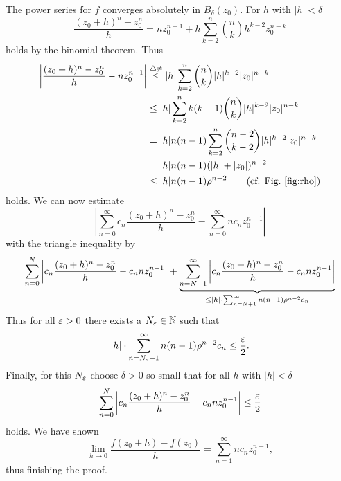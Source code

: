 \documentclass[a4paper,english]{article}
\begin{document}
\begin{pr}
    The power series for $f$ converges absolutely in $B_{\delta}(z_0)$.
    For $h$ with $| h | < \delta$
    \begin{equation*}
        \frac{(z_0 + h)^n - z_0^n}{h}
        = n z_0^{n - 1} + h \sum_{k = 2}^{n} \binom{n}{k} h^{k - 2} z_0^{n - k}
    \end{equation*}
    holds by the binomial theorem.
    Thus
    \begin{align*}
        \left|  \frac{(z_0 + h)^n - z_0^n}{h}
        - n z_0^{n - 1} \right|
        & \overset{\triangle \ne}{\le}
        | h | \sum_{k = 2}^{n} \binom{n}{k} |h|^{k - 2} |z_0|^{n - k} \\
        & \le | h | \sum_{k = 2}^{n} k (k - 1) \binom{n}{k} |h|^{k - 2} |z_0|^{n - k} \\
        & = | h | n (n - 1) \sum_{k = 2}^{n}  \binom{n - 2}{k - 2} |h|^{k - 2} |z_0|^{n - k} \\
        & = | h | n (n - 1) ( | h | + | z_0 |)^{n - 2} \\
        & \le | h | n (n - 1) \rho^{n - 2} \tag{cf. \figref{fig:rho}}
    \end{align*}
    holds.
    We can now estimate
    \begin{equation*}
        \left| \sum_{n = 0}^{\infty} c_n \frac{(z_0 + h)^n - z_0^n}{h} - \sum_{n = 0}^{\infty} n c_n z_0^{n - 1}\right|
    \end{equation*}
    with the triangle inequality by
    \small\begin{equation*} 
        \sum_{n = 0}^{N} \left| c_n \frac{(z_0 + h)^n - z_0^n}{h} - c_n n z_0^{n - 1}\right|  + \underbrace{\sum_{n = N + 1}^{\infty} \left| c_n \frac{(z_0 + h)^n - z_0^n}{h} - c_n n z_0^{n - 1}\right|}_{\normalsize\le | h | \cdot \sum_{n = N + 1}^{\infty} n (n - 1) \rho^{n - 2} c_n } 
    \end{equation*}\normalsize
    Thus for all $\varepsilon > 0$ there exists a $N_{\varepsilon} \in \operatorname{\mathbb{N}}$ such that
    \begin{equation*}
        | h | \cdot \sum_{n = N_{\varepsilon} + 1}^{\infty} n (n - 1) \rho^{n - 2} c_n
        \le \frac{\varepsilon}{2}.
    \end{equation*}
    Finally, for this $N_{\varepsilon}$ choose $\delta > 0$ so small that for all $h$ with $| h | < \delta$
    \begin{equation*}
        \sum_{n = 0}^{N} \left| c_n \frac{(z_0 + h)^n - z_0^n}{h} - c_n n z_0^{n - 1}\right| 
        \le \frac{\varepsilon}{2}
    \end{equation*}
    holds.
    We have shown
    \begin{equation*}
        \lim_{h \to 0} \frac{f(z_0 + h) - f(z_0)}{h}
        = \sum_{n = 1}^{\infty} n c_n z_0^{n - 1},
    \end{equation*}
    thus finishing the proof.
\end{pr}
\end{document}
